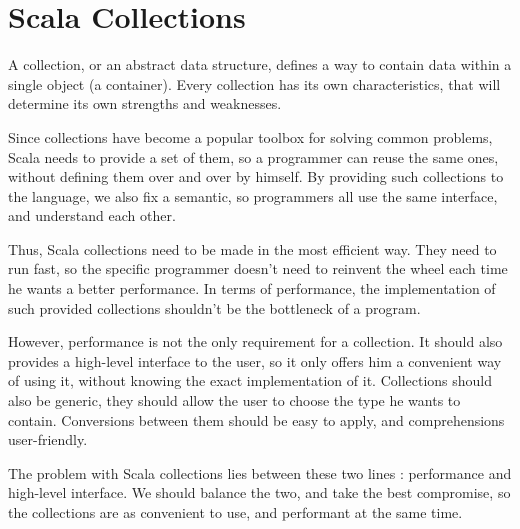 \section{Scala Collections}



A collection, or an abstract data structure, defines a way to contain data
within a single object (a container). Every collection has its own
characteristics, that will determine its own strengths and weaknesses.

Since collections have become a popular toolbox for solving common problems,
Scala needs to provide a set of them, so a programmer can reuse the
same ones, without defining them over and over by himself. By providing such 
collections to the language, we also fix a semantic, so programmers all use the
same interface, and understand each other.

Thus, Scala collections need to be made in the most efficient way. They need
to run fast, so the specific programmer doesn't need to reinvent the wheel each
time he wants a better performance. In terms of performance, the implementation
of such provided collections shouldn't be the bottleneck of a program.

However, performance is not the only requirement for a collection. It should
also provides a high-level interface to the user, so it only offers him a
convenient way of using it, without knowing the exact implementation of it.
Collections should also be generic, they should allow the user to choose the
type he wants to contain. Conversions between them should be easy to apply, and
comprehensions user-friendly.

The problem with Scala collections lies between these two lines : performance
and high-level interface. We should balance the two, and take the best
compromise, so the collections are as convenient to use, and performant at the
same time.


% 
% 
% 
% 
% 

